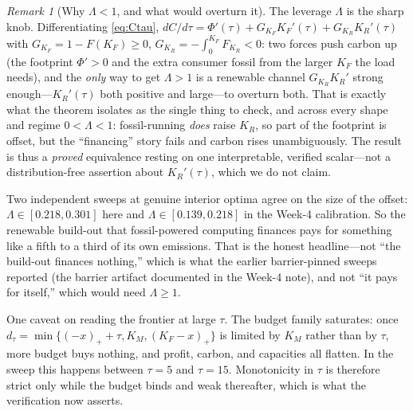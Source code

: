 \documentclass[11pt,reqno]{amsart}
\theoremstyle{plain}
\theoremstyle{definition}
\theoremstyle{remark}
\newtheorem{remark}{Remark}
\newcommand{\KR}{K_R}
\newcommand{\KF}{K_F}
\newcommand{\KM}{K_M}
\newcommand{\FKR}{F_{\!\KR}}
\begin{document}
\begin{remark}[Why $\Lambda<1$, and what would overturn it]
The leverage $\Lambda$ is the sharp knob. Differentiating \eqref{eq:Ctau},
$dC/d\tau=\Phi'(\tau)+G_{\KF}\KF'(\tau)+G_{\KR}\KR'(\tau)$ with
$G_{\KF}=1-F(\KF)\ge0$, $G_{\KR}=-\int_0^{\KF}\FKR<0$: two forces push carbon up
(the footprint $\Phi'>0$ and the extra consumer fossil from the larger $\KF$ the load
needs), and the \emph{only} way to get $\Lambda>1$ is a renewable channel $G_{\KR}\KR'$
strong enough---$\KR'(\tau)$ both positive and large---to overturn both. That is exactly
what the theorem isolates as the single thing to check, and across every shape and regime
$0<\Lambda<1$: fossil-running \emph{does} raise $\KR$, so part of the footprint is offset, but
the ``financing'' story fails and carbon rises unambiguously. The result is thus a
\emph{proved} equivalence resting on one interpretable, verified scalar---not a
distribution-free assertion about $\KR'(\tau)$, which we do not claim.

Two independent sweeps at genuine interior optima agree on the size of the offset:
$\Lambda\in[0.218,0.301]$ here and $\Lambda\in[0.139,0.218]$ in the Week-4 calibration. So
the renewable build-out that fossil-powered computing finances pays for something like a
fifth to a third of its own emissions. That is the honest headline---not ``the build-out
finances nothing,'' which is what the earlier barrier-pinned sweeps reported (the barrier artifact documented in the
Week-4 note), and not ``it pays for itself,'' which would
need $\Lambda\ge1$.

One caveat on reading the frontier at large $\tau$. The budget family saturates: once
$d_\tau=\min\{(-x)_++\tau,\KM,(\KF-x)_+\}$ is limited by $\KM$ rather than by $\tau$, more
budget buys nothing, and profit, carbon, and capacities all flatten. In the sweep this
happens between $\tau=5$ and $\tau=15$. Monotonicity in $\tau$ is therefore strict only
while the budget binds and weak thereafter, which is what the verification now asserts.
\end{remark}
\end{document}
